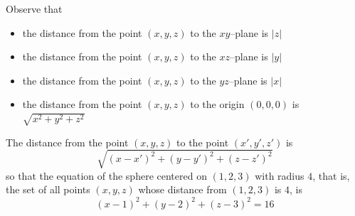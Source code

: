 Observe that
\begin{itemize}\itemsep1pt \parskip0pt 
\item the distance from the point $(x,y,z)$ to the $xy$--plane is $|z|$
\item the distance from the point $(x,y,z)$ to the $xz$--plane is $|y|$
\item the distance from the point $(x,y,z)$ to the $yz$--plane is $|x|$
\item the distance from the point $(x,y,z)$ to the origin $(0,0,0)$ is
     $\sqrt{x^2+y^2+z^2}$
\end{itemize}
The distance from the point $(x,y,z)$ to the point $(x',y',z')$ is
\begin{equation*}
\sqrt{(x-x')^2+(y-y')^2+(z-z')^2}
\end{equation*}
so that the equation of the sphere centered on $(1,2,3)$ with radius $4$,
that is, the set of all points $(x,y,z)$ whose distance from $(1,2,3)$ is $4$,
is
\begin{equation*}
(x-1)^2+(y-2)^2+(z-3)^2=16
\end{equation*}
